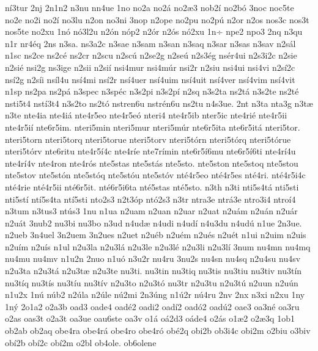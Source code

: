 {n^^ed3tur
2nj
2n1n2
n3nu
nn4ue
1no
no2a
no2^^e1
no2^^e63
nob2^^ed
no2b^^f3
3noc
noc5te
no2e
no2i
no2^^ed
no3lu
n2on
no3ni
3nop
n2ope
no2pu
no2p^^fa
n2or
n2os
nos3c
nos3t
nos5te
no2xu
1n^^f3
n^^f33l2u
n2^^f3n
n^^f3p2
n2^^f3r
n2^^f3s
n^^f32xu
1n^^f7
npe2
npo3
2nq
n3qu
n1r
nr4^^e9q
2ns
n3sa.
ns3a2c
n3sae
n3sam
n3san
n3saq
n3sar
n3sas
n3sav
n2s^^e1l
n1sc
ns2ce
ns2c^^e9
ns2cr
n2scu
n2sc^^fa
n2se2g
n2se^^fa
n2s3^^e9g
ns^^e9r4ui
n2s3i2c
n2sie
n2si^^e9
nsi2g
ns3ige
n2sii
n2si^^ed
nsi4mur
nsi4m^^far
nsi2r
n2siu
nsi4ui
nsi4vi
n2s^^ed2c
ns^^ed2g
n2s^^edi
ns^^edl4u
ns^^ed4mi
ns^^ed2r
ns^^ed4uer
ns^^ed4uim
ns^^ed4uit
ns^^ed4ver
ns^^ed4vim
ns^^ed4vit
n1sp
ns2pa
ns2p^^e1
n3spec
n3sp^^e9c
n3s2pi
n3s2p^^ed
n2sq
n3s2ta
ns2t^^e1
n3s2te
ns2t^^e9
nsti5t4
nst^^ed3t4
n3s2to
ns2t^^f3
nstren6u
nstr^^e9n6u
ns2tu
n4s3ue.
2nt
n3ta
nta3g
n3t^^e6
n3te
nte4ia
nte4i^^e1
nte4r5eo
nte4r5e^^f3
nteri4
nte4r5ib
nter5ic
nte4ri^^e9
nte4r5ii
nte4r5i^^ed
nte6r5im.
nteri5min
nteri5mur
nteri5m^^far
nte6r5ita
nte6r5it^^e1
nteri5tor.
nteri5torn
nteri5torq
nteri5torue
nteri5torv
nteri5t^^f3rn
nteri5t^^f3rq
nteri5t^^f3rue
nteri5t^^f3rv
nte6ritu
nte4r5^^ed4c
nte4r^^ede
nte7r^^edmin
nte6r5^^ed6mu
nte6r5^^ed6ti
nte4r^^ed4u
nte4r^^ed4v
nte4ron
nte4r^^f3s
nte5stas
nte5st^^e1s
nte5sto.
nte5ston
nte5stoq
nte5stou
nte5stov
nte5st^^f3n
nte5st^^f3q
nte5st^^f3u
nte5st^^f3v
nt^^e94r5eo
nt^^e94r5es
nt^^e94ri.
nt^^e94r5i4c
nt^^e94rie
nt^^e94r5ii
nt^^e96r5it.
nt^^e96r5i6ta
nt^^e95stas
nt^^e95sto.
n3th
n3ti
nti5s4t^^e1
nti5sti
nti5st^^ed
nt^^ed5s4ta
nt^^ed5sti
nto2s3
n2t3^^f3p
nt^^f32s3
n3tr
ntra3e
ntr^^e13e
ntro3i4
ntro^^ed4
n3tum
n3tus3
nt^^fas3
1nu
n1ua
n2uam
n2uan
n2uar
n2uat
n2u^^e1m
n2u^^e1n
n2u^^e1r
n2u^^e1t
3nub2
nu3bi
nu3bo
n3ud
n4ud^^e6
n4udi
n4ud^^ed
n4u3du
n4ud^^fa
n1ue
2n3ue.
n2ueb
3n4uel
3n2uem
3n2ues
n2uet
n2u^^e9b
n2u^^e9m
n2u^^e9s
n2u^^e9t
n1ui
n2uim
n2uis
n2u^^edm
n2u^^eds
n1ul
n2u3la
n2u3l^^e1
n2u3le
n2u3l^^e9
n2u3li
n2u3l^^ed
3num
nu4mn
nu4mq
nu4mu
nu4mv
n1u2n
2nuo
n1u^^f3
n3u2r
nu4ru
3nu2s
nu4sn
nu4sq
n2u4su
nu4sv
n2u3ta
n2u3t^^e1
n2u3t^^e6
n2u3te
nu3ti.
nu3tin
nu3tiq
nu3tis
nu3tiu
nu3tiv
nu3t^^edn
nu3t^^edq
nu3t^^eds
nu3t^^edu
nu3t^^edv
n2u3to
n2u3t^^f3
nu3tr
n2u3tu
n2u3t^^fa
n2uun
n2u^^fan
n1u2x
1n^^fa
n^^fab2
n2^^fala
n2^^fale
n^^fa2mi
2n3^^fang
n1^^fa2r
n^^fa4ru
2nv
2nx
n3xi
n2xu
1ny
1n^^fd
2o1a2
o2a3b
oad3
oade4
oad^^e92
oadi2
oad^^ed2
oad^^f32
oad^^fa2
oae3
oa3n^^e9
oa3ru
o2as
oas3t
o2a3t
oa3ue
oau6ste
oa3v
o1^^e1
o^^e12d3
o^^e1de4
o2^^e1s
o1^^e62
o2^^e63q
1ob1
ob2ab
ob2aq
obe4ra
obe4r^^e1
obe4ro
obe4r^^f3
ob^^e92q
obi2b
ob3i4c
obi2m
o2biu
o3biv
ob^^ed2b
ob^^ed2c
ob^^ed2m
o2bl
ob4ole.
ob6olene
}
